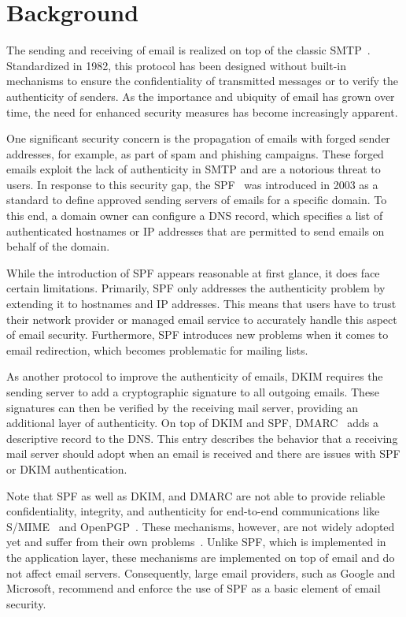 
\section{Background}
\label{sec:background}

The sending and receiving of email is realized on top of the classic \ac{SMTP}~\citep{rfc821}.
Standardized in 1982, this protocol has been designed without built-in mechanisms to ensure the confidentiality of transmitted messages or to verify the authenticity of senders.
As the importance and ubiquity of email has grown over time, the need for enhanced security measures has become increasingly apparent.

One significant security concern is the propagation of emails with forged sender addresses, for example, as part of spam and phishing campaigns. 
These forged emails exploit the lack of authenticity in \ac{SMTP} and are a notorious threat to users.
In response to this security gap, the \ac{SPF}~\citep{rfc4408} was introduced in 2003 as a standard to define approved sending servers of emails for a specific domain.
To this end, a domain owner can configure a \ac{DNS} record, which specifies a list of authenticated hostnames or IP addresses that are permitted to send emails on behalf of the domain.

While the introduction of \ac{SPF} appears reasonable at first glance, it does face certain limitations.
Primarily, SPF only addresses the authenticity problem by extending it to hostnames and IP addresses.
This means that users have to trust their network provider or managed email service to accurately handle this aspect of email security.
Furthermore, SPF introduces new problems when it comes to email redirection, which becomes problematic for mailing lists.

As another protocol to improve the authenticity of emails, \ac{DKIM} requires the sending server to add a cryptographic signature to all outgoing emails.
These signatures can then be verified by the receiving mail server, providing an additional layer of authenticity.
On top of DKIM and SPF, \ac{DMARC}~\citep{rfc7489} adds a descriptive record to the DNS.
This entry describes the behavior that a receiving mail server should adopt when an email is received and there are issues with SPF or DKIM authentication.


Note that \ac{SPF} as well as \ac{DKIM}, and \ac{DMARC} are not able to provide reliable confidentiality, integrity, and authenticity for end-to-end communications like S/MIME~\citep{rfc8551} and OpenPGP~\citep{rfc3156}.
These mechanisms, however, are not widely adopted yet and suffer from their own problems~\citep{Poddebniak2018}. Unlike SPF, which is implemented in the application layer, these mechanisms are implemented on top of email and do not affect email servers. 
Consequently, large email providers, such as Google and Microsoft, recommend and enforce the use of \ac{SPF} as a basic element of email security. 

